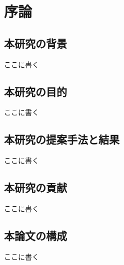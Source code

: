 \chapter{序論}
\thispagestyle{empty}

\section{本研究の背景}
ここに書く

\section{本研究の目的}
ここに書く
　
\section{本研究の提案手法と結果}
ここに書く

\section{本研究の貢献}
ここに書く

\section{本論文の構成}
ここに書く